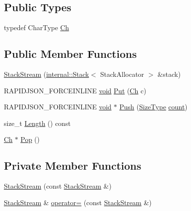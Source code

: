 \subsection*{Public Types}
\begin{DoxyCompactItemize}
\item 
typedef Char\+Type \hyperlink{classGenericReader_1_1StackStream_a8b6ba64b97ed5f79f17d96428fd50ec0}{Ch}
\end{DoxyCompactItemize}
\subsection*{Public Member Functions}
\begin{DoxyCompactItemize}
\item 
\hyperlink{classGenericReader_1_1StackStream_a288cf0f0385f706856b0e19c447e74ab}{Stack\+Stream} (\hyperlink{classinternal_1_1Stack}{internal\+::\+Stack}$<$ Stack\+Allocator $>$ \&stack)
\item 
R\+A\+P\+I\+D\+J\+S\+O\+N\+\_\+\+F\+O\+R\+C\+E\+I\+N\+L\+I\+NE \hyperlink{imgui__impl__opengl3__loader_8h_ac668e7cffd9e2e9cfee428b9b2f34fa7}{void} \hyperlink{classGenericReader_1_1StackStream_aba4f7888d42e872ccbf668289373006f}{Put} (\hyperlink{classGenericReader_1_1StackStream_a8b6ba64b97ed5f79f17d96428fd50ec0}{Ch} c)
\item 
R\+A\+P\+I\+D\+J\+S\+O\+N\+\_\+\+F\+O\+R\+C\+E\+I\+N\+L\+I\+NE \hyperlink{imgui__impl__opengl3__loader_8h_ac668e7cffd9e2e9cfee428b9b2f34fa7}{void} $\ast$ \hyperlink{classGenericReader_1_1StackStream_adc439f24eb3dd3c8c5b9203716d41bd9}{Push} (\hyperlink{rapidjson_8h_a5ed6e6e67250fadbd041127e6386dcb5}{Size\+Type} \hyperlink{imgui__impl__opengl3__loader_8h_a619bc20e8198de3bd3f3d7fc34de66b2}{count})
\item 
size\+\_\+t \hyperlink{classGenericReader_1_1StackStream_a528a88479d08ccf62831251fbd35216b}{Length} () const
\item 
\hyperlink{classGenericReader_1_1StackStream_a8b6ba64b97ed5f79f17d96428fd50ec0}{Ch} $\ast$ \hyperlink{classGenericReader_1_1StackStream_a4c654610639025799a533b188cdfeb62}{Pop} ()
\end{DoxyCompactItemize}
\subsection*{Private Member Functions}
\begin{DoxyCompactItemize}
\item 
\hyperlink{classGenericReader_1_1StackStream_a66f42e9a55810bf5bfe1b5c86c09dd51}{Stack\+Stream} (const \hyperlink{classGenericReader_1_1StackStream}{Stack\+Stream} \&)
\item 
\hyperlink{classGenericReader_1_1StackStream}{Stack\+Stream} \& \hyperlink{classGenericReader_1_1StackStream_af760ba2cf259372ffc9dd4d879cb55ef}{operator=} (const \hyperlink{classGenericReader_1_1StackStream}{Stack\+Stream} \&)
\end{DoxyCompactItemize}
